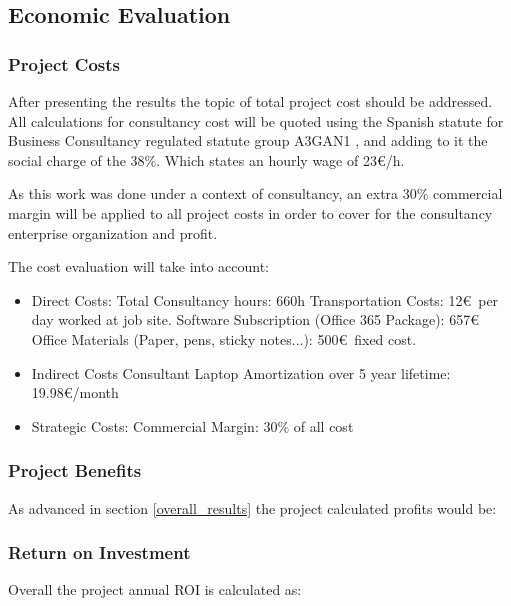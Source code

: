 \documentclass[]{article}
\begin{document}
\clearpage
\newpage
\subsection{Economic Evaluation}
\subsubsection{Project Costs}
After presenting the results the topic of total project cost should be addressed.
All calculations for consultancy cost will be quoted using the Spanish statute for Business Consultancy regulated statute group A3GAN1 \cite{ministerio_de_trabajo_y_economia_social_resolucion_2025}, and adding to it the social charge of the 38\%. Which states an hourly wage of 23\euro/h.

As this work was done under a context of consultancy, an extra 30\% commercial margin will be applied to all project costs in order to cover for the consultancy enterprise organization and profit.

The cost evaluation will take into account:
\begin{itemize}
  \item Direct Costs:
    \subitem Total Consultancy hours: 660h
    \subitem Transportation Costs: 12\euro~per day worked at job site.
    \subitem Software Subscription (Office 365 Package): 657\euro
    \subitem Office Materials (Paper, pens, sticky notes...): 500\euro~fixed cost.
  \item Indirect Costs
    \subitem Consultant Laptop Amortization over 5 year lifetime: 19.98\euro/month 
  \item Strategic Costs:
    \subitem Commercial Margin: 30\% of all cost
\end{itemize}


\subsubsection{Project Benefits}
As advanced in section \ref{overall_results} the project calculated profits would be:



\subsubsection{Return on Investment}
Overall the project annual ROI is calculated as:
\end{document}
